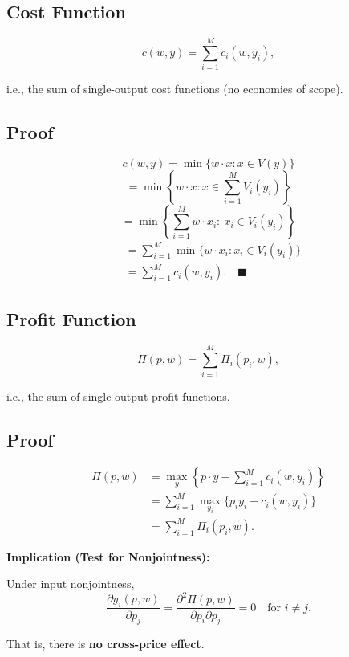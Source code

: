 \subsection*{Cost Function}

\[
c(w,y)
=
\sum_{i=1}^M c_i(w,y_i),
\]

i.e., the sum of single-output cost functions (no economies of scope).

\subsection*{Proof}

\[
c(w,y)
=
\min \{w\cdot x : x \in V(y)\}
\]
\[
=
\min \left\{w\cdot x : x \in \sum_{i=1}^M V_i(y_i)\right\}
\]
\[
=
\min \left\{
\sum_{i=1}^M w\cdot x_i
:\ x_i \in V_i(y_i)
\right\}
\]
\[
\begin{aligned}
&=
\sum_{i=1}^M \min \{w\cdot x_i : x_i \in V_i(y_i)\}\\
&=
\sum_{i=1}^M c_i(w,y_i).
\quad \blacksquare
\end{aligned}
\]

\subsection*{Profit Function}

\[
\Pi(p,w)
=
\sum_{i=1}^M \Pi_i(p_i,w),
\]

i.e., the sum of single-output profit functions.


\subsection*{Proof}

\[
\begin{aligned}
\Pi(p,w)
&=
\max_y \left\{ p\cdot y - \sum_{i=1}^M c_i(w,y_i) \right\}\\
&=
\sum_{i=1}^M \max_{y_i} \{ p_i y_i - c_i(w,y_i) \}\\
&=
\sum_{i=1}^M \Pi_i(p_i,w).
\end{aligned}
\]

\medskip

\textbf{Implication (Test for Nonjointness):}

Under input nonjointness,
\[
\frac{\partial y_i(p,w)}{\partial p_j}
=
\frac{\partial^2 \Pi(p,w)}{\partial p_i \partial p_j}
=
0
\quad \text{for } i \ne j.
\]

\medskip

That is, there is \textbf{no cross-price effect}.

